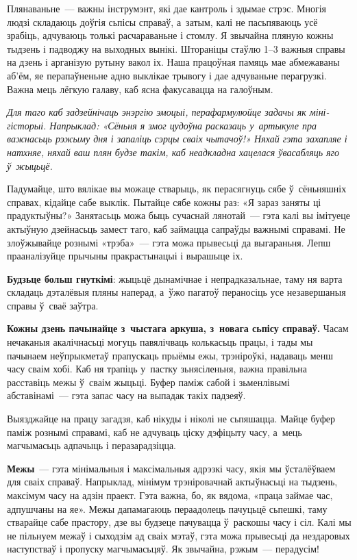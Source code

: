 Плянаваньне~--- важны інструмэнт, які дае кантроль і здымае стрэс. Многія людзі складаюць доўгія сьпісы справаў, а~затым, калі не пасьпяваюць усё зрабіць, адчуваюць толькі расчараваньне і стомлу. Я звычайна пляную кожны тыдзень і падводжу на выходных вынікі. Штораніцы стаўлю 1--3 важныя справы на дзень і арганізую рутыну вакол іх. Наша працоўная памяць мае абмежаваны аб'ём, яе перапаўненьне адно выклікае трывогу і дае адчуваньне перагрузкі. Важна мець лёгкую галаву, каб ясна факусавацца на галоўным.

\emph{Для таго каб задзейнічаць энэргію эмоцыі, перафармулюйце задачы як міні-гісторыі. Напрыклад: «Сёньня я змог цудоўна расказаць у~артыкуле пра важнасьць рэжыму дня і запаліць сэрцы сваіх чытачоў!» Няхай гэта захапляе і натхняе, няхай ваш плян будзе такім, каб неадкладна хацелася ўвасабляць яго ў~жыцьцё.}

Падумайце, што вялікае вы можаце стварыць, як перасягнуць сябе ў~сёньняшніх справах, кідайце сабе выклік. Пытайце сябе кожны раз: «Я зараз заняты ці прадуктыўны?» Занятасьць можа быць сучаснай лянотай~--- гэта калі вы імітуеце актыўную дзейнасьць замест таго, каб займацца сапраўды важнымі справамі. Не злоўжывайце рознымі «трэба»~--- гэта можа прывесьці да выгараньня. Лепш прааналізуйце прычыны пракрастынацыі і вырашыце іх.

\textbf{Будзьце больш гнуткімі}: жыцьцё дынамічнае і непрадказальнае, таму ня варта складаць дэталёвыя пляны наперад, а~ўжо пагатоў пераносіць усе незавершаныя справы ў~сваё заўтра.

\textbf{Кожны дзень пачынайце з~чыстага аркуша, з~новага сьпісу справаў.} Часам нечаканыя акалічнасьці могуць павялічваць колькасьць працы, і тады мы пачынаем неўпрыкметаў прапускаць прыёмы ежы, трэніроўкі, надаваць менш часу сваім хобі. Каб ня трапіць у~пастку зьнясіленьня, важна правільна расставіць межы ў~сваім жыцьці. Буфер паміж сабой і зьменлівымі абставінамі~--- гэта запас часу на выпадак такіх падзеяў. 

Выязджайце на працу загадзя, каб нікуды і ніколі не сьпяшацца. Майце буфер паміж рознымі справамі, каб не адчуваць ціску дэфіцыту часу, а~мець магчымасьць адпачыць і перазарадзіцца.


\textbf{Межы}~--- гэта мінімальныя і максімальныя адрэзкі часу, якія мы ўсталёўваем для сваіх справаў. Напрыклад, мінімум трэніровачнай актыўнасьці на тыдзень, максімум часу на адзін праект. Гэта важна, бо, як вядома, «праца займае час, адпушчаны на яе». Межы дапамагаюць пераадолець пачуцьцё сьпешкі, таму стварайце сабе прастору, дзе вы будзеце пачувацца ў~раскошы часу і сіл. Калі мы не пільнуем межаў і сыходзім ад сваіх мэтаў, гэта можа прывесьці да нездаровых наступстваў і пропуску магчымасьцяў. Як звычайна, рэжым~--- перадусім!

